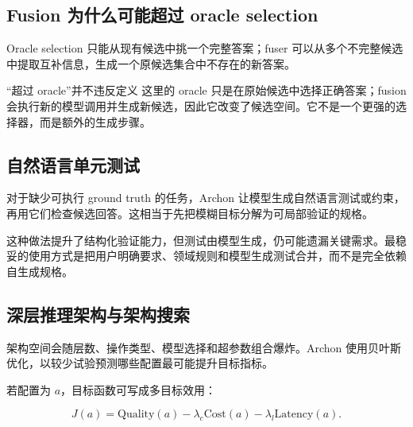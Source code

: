 \documentclass[a4paper]{article}
\begin{document}
\subsection{Fusion 为什么可能超过 oracle selection}

Oracle selection 只能从现有候选中挑一个完整答案；fuser 可以从多个不完整候选中提取互补信息，生成一个原候选集合中不存在的新答案。


\begin{warningbox}{“超过 oracle”并不违反定义}
这里的 oracle 只是在原始候选中选择正确答案；fusion 会执行新的模型调用并生成新候选，因此它改变了候选空间。它不是一个更强的选择器，而是额外的生成步骤。
\end{warningbox}

\subsection{自然语言单元测试}

对于缺少可执行 ground truth 的任务，Archon 让模型生成自然语言测试或约束，再用它们检查候选回答。这相当于先把模糊目标分解为可局部验证的规格。


这种做法提升了结构化验证能力，但测试由模型生成，仍可能遗漏关键需求。最稳妥的使用方式是把用户明确要求、领域规则和模型生成测试合并，而不是完全依赖自生成规格。

\subsection{深层推理架构与架构搜索}


架构空间会随层数、操作类型、模型选择和超参数组合爆炸。Archon 使用贝叶斯优化，以较少试验预测哪些配置最可能提升目标指标。


若配置为 $a$，目标函数可写成多目标效用：

$$
J(a)=\mathrm{Quality}(a)-\lambda_c\mathrm{Cost}(a)-\lambda_l\mathrm{Latency}(a).
$$
\end{document}
